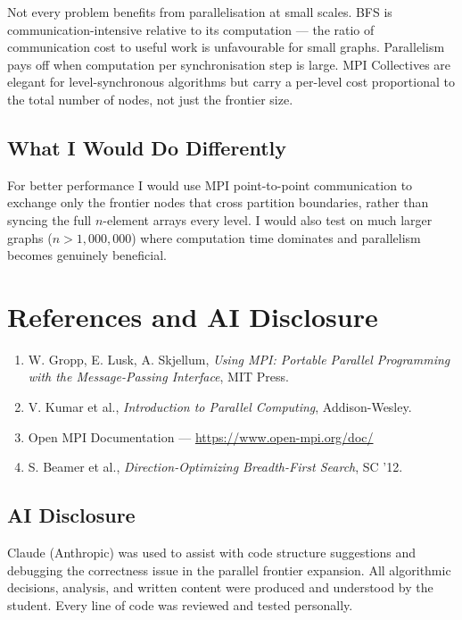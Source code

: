 \documentclass[12pt,a4paper]{article}
\begin{document}
Not every problem benefits from parallelisation at small scales. BFS is
communication-intensive relative to its computation --- the ratio of
communication cost to useful work is unfavourable for small graphs. Parallelism
pays off when computation per synchronisation step is large. MPI Collectives are
elegant for level-synchronous algorithms but carry a per-level cost proportional
to the total number of nodes, not just the frontier size.

\subsection{What I Would Do Differently}

For better performance I would use MPI point-to-point communication to exchange
only the frontier nodes that cross partition boundaries, rather than syncing the
full $n$-element arrays every level. I would also test on much larger graphs
($n > 1{,}000{,}000$) where computation time dominates and parallelism becomes
genuinely beneficial.

\section{References and AI Disclosure}

\begin{enumerate}[leftmargin=1.5em]
    \item W. Gropp, E. Lusk, A. Skjellum,
          \textit{Using MPI: Portable Parallel Programming with the
          Message-Passing Interface}, MIT Press.
    \item V. Kumar et al.,
          \textit{Introduction to Parallel Computing}, Addison-Wesley.
    \item Open MPI Documentation --- \url{https://www.open-mpi.org/doc/}
    \item S. Beamer et al.,
          \textit{Direction-Optimizing Breadth-First Search}, SC '12.
\end{enumerate}

\subsection*{AI Disclosure}

Claude (Anthropic) was used to assist with code structure suggestions and
debugging the correctness issue in the parallel frontier expansion. All
algorithmic decisions, analysis, and written content were produced and understood
by the student. Every line of code was reviewed and tested personally.
\end{document}
